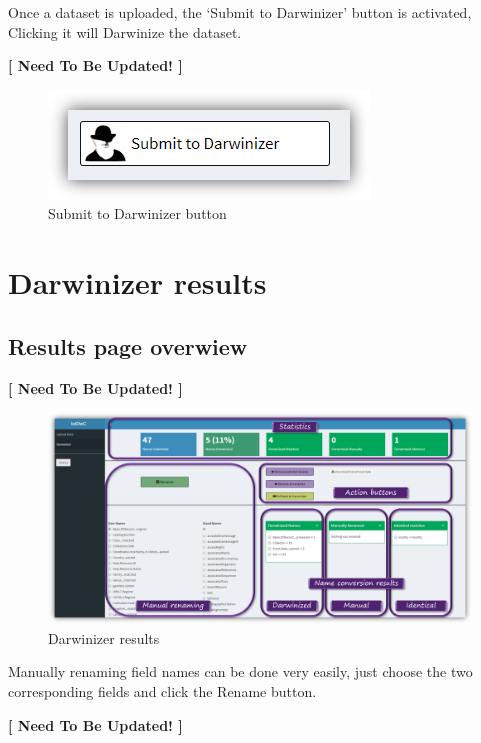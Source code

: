 \documentclass[]{book}
\theoremstyle{definition}
\theoremstyle{definition}
\theoremstyle{definition}
\theoremstyle{remark}
\begin{document}
Once a dataset is uploaded, the `Submit to Darwinizer' button is
activated, Clicking it will Darwinize the dataset.

\textbf{{{[} Need To Be Updated! {]}}}

\begin{figure}
\centering
\includegraphics{img/bdDwC_Submit.png}
\caption{Submit to Darwinizer button}
\end{figure}

\section{Darwinizer results}\label{darwinizer-results}

\subsection{Results page overwiew}\label{results-page-overwiew}

\textbf{{{[} Need To Be Updated! {]}}}

\begin{figure}
\centering
\includegraphics{img/bdDwC_Darwinizer_results.png}
\caption{Darwinizer results}
\end{figure}

Manually renaming field names can be done very easily, just choose the
two corresponding fields and click the Rename button.

\textbf{{{[} Need To Be Updated! {]}}}
\end{document}
